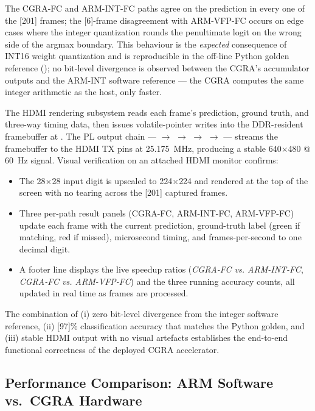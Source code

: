 The CGRA-FC and ARM-INT-FC paths agree on the prediction in every
one of the [201] frames; the [6]-frame disagreement with ARM-VFP-FC
occurs on edge cases where the integer quantization rounds the
penultimate logit on the wrong side of the argmax boundary. This
behaviour is the \emph{expected} consequence of INT16 weight
quantization and is reproducible in the off-line Python golden
reference (); no bit-level divergence is
observed between the CGRA's accumulator outputs and the ARM-INT
software reference --- the CGRA computes the same integer
arithmetic as the host, only faster.

The HDMI rendering subsystem reads each frame's prediction, ground
truth, and three-way timing data, then issues volatile-pointer
writes into the DDR-resident framebuffer at . The PL
output chain ---  $\to$  $\to$
 $\to$  $\to$  ---
streams the framebuffer to the HDMI TX pins at 25.175~MHz,
producing a stable 640$\times$480 @ 60~Hz signal. Visual
verification on an attached HDMI monitor confirms:

\begin{itemize}[leftmargin=1.4cm,itemsep=2pt,topsep=2pt]
\item The 28$\times$28 input digit is upscaled to 224$\times$224 and
rendered at the top of the screen with no tearing across the [201]
captured frames.
\item Three per-path result panels (CGRA-FC, ARM-INT-FC, ARM-VFP-FC)
update each frame with the current prediction, ground-truth label
(green if matching, red if missed), microsecond timing, and
frames-per-second to one decimal digit.
\item A footer line displays the live speedup ratios
(\emph{CGRA-FC vs. ARM-INT-FC}, \emph{CGRA-FC vs. ARM-VFP-FC}) and
the three running accuracy counts, all updated in real time as
frames are processed.
\end{itemize}

The combination of (i) zero bit-level divergence from the integer
software reference, (ii) [97]\% classification accuracy that matches
the Python golden, and (iii) stable HDMI output with no visual
artefacts establishes the end-to-end functional correctness of the
deployed CGRA accelerator.

\subsection{Performance Comparison: ARM Software vs.\ CGRA Hardware}
\label{ssec:perf}

